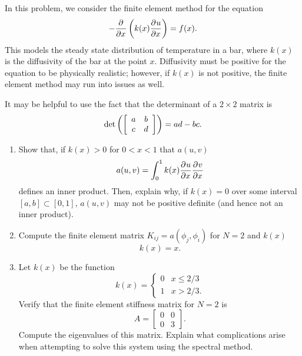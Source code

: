 In this problem, we consider the finite element method for the equation
\[
-\frac{\partial^{} }{\partial x^{}}\left(k(x)\frac{\partial^{} u}{\partial x^{}}\right) = f(x).
\]
This models the steady state distribution of temperature in a bar, where $k(x)$ is the diffusivity of the bar at the point $x$.  Diffusivity must be positive for the equation to be physically realistic; however, if $k(x)$ is not positive, the finite element method may run into issues as well.  

It may be helpful to use the fact that the determinant of a $2\times 2$ matrix is
\[
{\rm det}\left(\left[
\begin{array}{cc}
a &b\\
c &d
\end{array}
\right]\right) = ad-bc.
\]

\begin{enumerate}
\item Show that, if $k(x) > 0$ for $0 < x < 1$ that $a(u,v)$
\[
a(u,v) = \int_0^1 k(x)\frac{\partial^{} u}{\partial x^{}}\frac{\partial^{} v}{\partial x^{}}
\]
defines an inner product.  Then, explain why, if $k(x) = 0$ over some interval $[a,b] \subset [0,1]$, $a(u,v)$ may not be positive definite (and hence not an inner product).  
\item Compute the finite element matrix $K_{ij} = a(\phi_j,\phi_i)$ for $N = 2$ and $k(x)$ 
\[
k(x) = x.
\]
\item Let $k(x)$ be the function
\[
k(x) = \begin{cases}
0 & x \leq 2/3\\
1 & x > 2/3.
\end{cases}
\]
Verify that the finite element stiffness matrix for $N=2$ is
\[
A = \left[
\begin{array}{cc}
0 &0\\
0 &3
\end{array}
\right].
\]
Compute the eigenvalues of this matrix.  Explain what complications arise when attempting to solve this system using the spectral method.  
\end{enumerate}